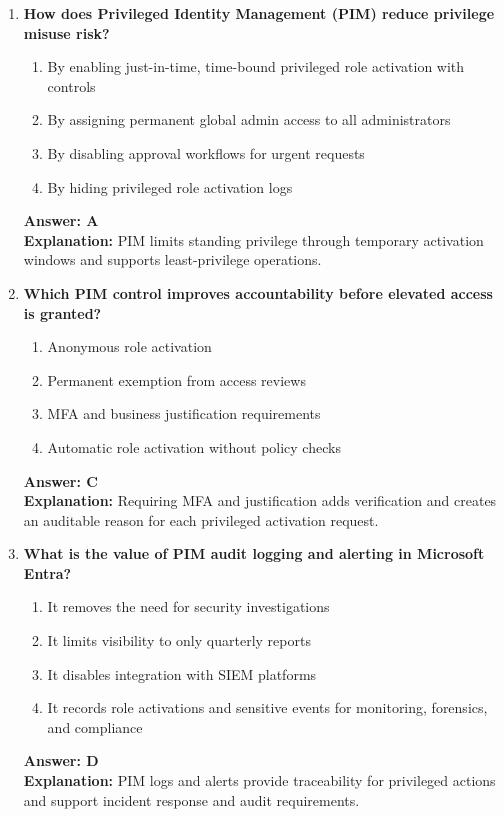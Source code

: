 \documentclass[10pt]{article}
\begin{document}
\begin{enumerate}[leftmargin=*]
\item \textbf{How does Privileged Identity Management (PIM) reduce privilege misuse risk?}
\begin{enumerate}[label=\Alph*.]
  \item By enabling just-in-time, time-bound privileged role activation with controls
  \item By assigning permanent global admin access to all administrators
  \item By disabling approval workflows for urgent requests
  \item By hiding privileged role activation logs
\end{enumerate}
\textbf{Answer: A}\\
\textbf{Explanation:} PIM limits standing privilege through temporary activation windows and supports least-privilege operations.

\item \textbf{Which PIM control improves accountability before elevated access is granted?}
\begin{enumerate}[label=\Alph*.]
  \item Anonymous role activation
  \item Permanent exemption from access reviews
  \item MFA and business justification requirements
  \item Automatic role activation without policy checks
\end{enumerate}
\textbf{Answer: C}\\
\textbf{Explanation:} Requiring MFA and justification adds verification and creates an auditable reason for each privileged activation request.

\item \textbf{What is the value of PIM audit logging and alerting in Microsoft Entra?}
\begin{enumerate}[label=\Alph*.]
  \item It removes the need for security investigations
  \item It limits visibility to only quarterly reports
  \item It disables integration with SIEM platforms
  \item It records role activations and sensitive events for monitoring, forensics, and compliance
\end{enumerate}
\textbf{Answer: D}\\
\textbf{Explanation:} PIM logs and alerts provide traceability for privileged actions and support incident response and audit requirements.

\end{enumerate}
\clearpage
\end{document}
